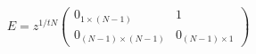 \begin{equation}
E = z^{1/tN}
   \begin{pmatrix}
   0_{1 \times (N-1)}        & 1 \\
   0_{(N-1) \times (N-1)}    & 0_{(N-1) \times 1}
   \end{pmatrix}
\end{equation}

